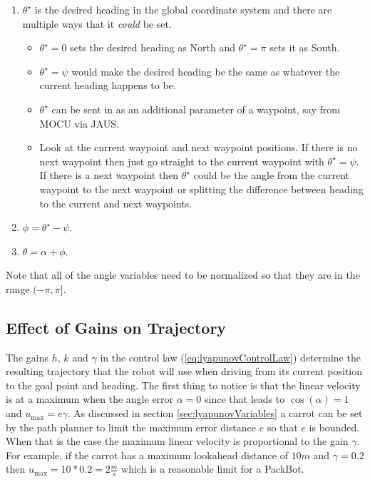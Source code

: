\begin{enumerate}
\item $\theta^\star$ is the desired heading in the global coordinate system and there are multiple ways that it \textit{could} be set.
\begin{itemize}
\item $\theta^\star=0$ sets the desired heading as North and $\theta^\star=\pi$ sets it as South.
\item $\theta^\star=\psi$ would make the desired heading be the same as whatever the current heading happens to be.
\item $\theta^\star$ can be sent in as an additional parameter of a waypoint, say from MOCU via JAUS.
\item Look at the current waypoint and next waypoint positions. If there is no next waypoint then just go straight to the current waypoint with $\theta^\star=\psi$. If there is a next waypoint then $\theta^\star$ could be the angle from the current waypoint to the next waypoint or splitting the difference between heading to the current and next waypoints.
\end{itemize}
\item $\phi=\theta^\star-\psi$.
\item $\theta=\alpha + \phi$.
\end{enumerate}
Note that all of the angle variables need to be normalized so that they are in the range $(-\pi,\pi]$.

\subsection{Effect of Gains on Trajectory}
\label{sec:lyapunovTrajectoryConvergence}
The gains $h$, $k$ and $\gamma$ in the control law (\ref{eq:lyapunovControlLaw}) determine the resulting trajectory that the robot will use when driving from its current position to the goal point and heading. The first thing to notice is that the linear velocity is at a maximum when the angle error $\alpha=0$ since that leads to $\cos(\alpha)=1$ and $u_{\text{max}}=e\gamma$. As discussed in section \ref{sec:lyapunovVariables} a carrot can be set by the path planner to limit the maximum error distance $e$ so that $e$ is bounded. When that is the case the maximum linear velocity is proportional to the gain $\gamma$. For example, if the carrot has a maximum lookahead distance of $10m$ and $\gamma=0.2$ then $u_{\text{max}}=10*0.2=2\tfrac{m}{s}$ which is a reasonable limit for a PackBot.

